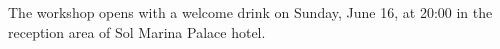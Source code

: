 \documentclass[12pt]{report}
\begin{document}
{}


\pagebreak
{}
{}


{}


{}



{\large

\newpage
 \printindex }


\newpage
\thispagestyle{empty}



\vspace{0.0cm}

The workshop opens with a welcome drink on Sunday, June 16, at 20:00 in the reception area of Sol Marina Palace hotel.




\end{document}
